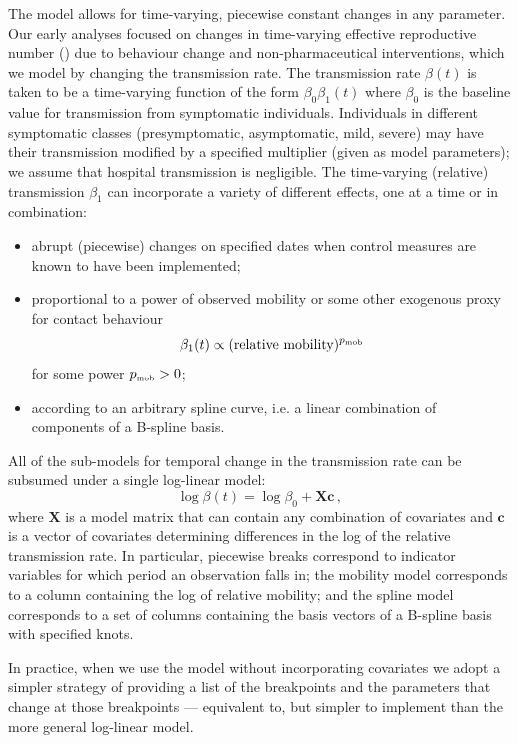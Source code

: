 \documentclass[12pt]{article}\usepackage[]{graphicx}\usepackage[]{color}
\begin{document}
The model allows for time-varying, piecewise constant changes in any
parameter. Our early analyses focused on changes in time-varying effective reproductive
number (\Rt) due
to behaviour change and non-pharmaceutical interventions, which we model
by changing the transmission rate.
The transmission rate $\beta(t)$
is taken to be a time-varying function of the form
$\beta_0 \beta_1(t)$ 
where $\beta_0$ is the baseline value for transmission
from symptomatic individuals.
Individuals in different symptomatic classes (presymptomatic, asymptomatic, mild, severe)
may have their transmission modified by a specified multiplier (given as model parameters);
we assume that hospital transmission is negligible.
The time-varying (relative) transmission $\beta_1$ can incorporate a variety of different effects, one at a time or in combination:
\begin{itemize}
\item abrupt (piecewise) changes on specified dates when control
  measures are known to have been implemented;
\item proportional to a power of observed mobility or some other
  exogenous proxy for contact behaviour
\[
  \beta_1(t) \propto (\textrm{relative mobility})^{{{p}_{\textrm{\tiny mob}}}}
\]
for some power ${{p}_{\textrm{\tiny mob}}}>0$;
\item according to an arbitrary spline curve, i.e. a linear combination
  of components of a B-spline basis.
\end{itemize}

All of the sub-models for temporal change in the transmission
rate can be subsumed under a single log-linear model:
\begin{equation}\label{eq:betamodel}
\log \beta(t) = \log \beta_0 + \boldsymbol{X}\boldsymbol{c}
\,,
\end{equation}
where $\boldsymbol{X}$ is a model matrix that can contain any combination
of covariates and $\boldsymbol{c}$ is a vector of covariates determining
differences in the log of the relative transmission rate.
In particular, piecewise breaks correspond to indicator variables
for which period an observation falls in; the mobility model corresponds to a column
containing the log of relative mobility; and the spline model corresponds to a set of
columns containing the basis vectors of a B-spline basis with specified knots.

In practice, when we use the model without incorporating covariates we adopt a simpler strategy of providing a list of the breakpoints and the parameters that change at those breakpoints --- equivalent to, but simpler to implement than the more general log-linear model.
\end{document}
